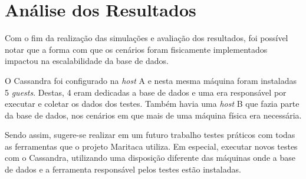 \section{Análise dos Resultados}
\label{sec:analResul}

Com o fim da realização das simulações e avaliação dos resultados, foi possível notar que a forma com que os cenários foram fisicamente implementados impactou na escalabilidade da base de dados. 

O Cassandra foi configurado na \textit{host} A e nesta mesma máquina foram instaladas 5 \textit{guests}. Destas, 4 eram dedicadas a base de dados e uma era responsável por executar e coletar os dados dos testes. Também havia uma \textit{host} B que fazia parte da base de dados, nos cenários em que mais de uma máquina física era necessária.

Sendo assim, sugere-se realizar em um futuro trabalho testes práticos com todas as ferramentas que o projeto Maritaca utiliza. Em especial, executar novos testes com o Cassandra, utilizando uma disposição diferente das máquinas onde a base de dados e a ferramenta responsável pelos testes estão instaladas.
